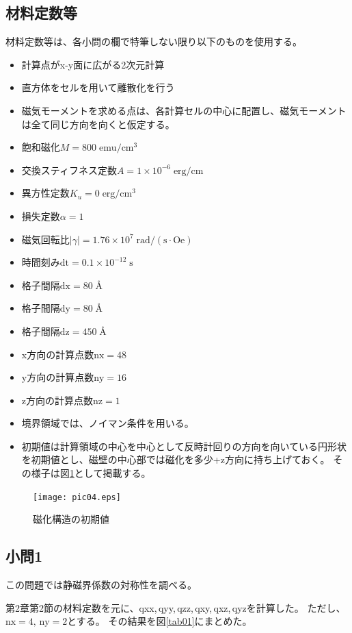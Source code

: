 \documentclass{jsarticle}
\begin{document}
\subsection{材料定数等}
材料定数等は、各小問の欄で特筆しない限り以下のものを使用する。
\begin{itemize}
	\item 計算点がx-y面に広がる2次元計算
	\item 直方体をセルを用いて離散化を行う
	\item 磁気モーメントを求める点は、各計算セルの中心に配置し、磁気モーメントは全て同じ方向を向くと仮定する。
	\item 飽和磁化$M = 800\;\mathrm{emu/cm^3}$
	\item 交換スティフネス定数$A = 1\times 10^{-6}\;\mathrm{erg/cm}$
	\item 異方性定数$K_u = 0\;\mathrm{erg/cm^3}$
	\item 損失定数$\alpha = 1$
	\item 磁気回転比$\lvert\gamma\rvert = 1.76\times 10^7\;\mathrm{rad/(s\cdot Oe)}$
	\item 時間刻み$\mathrm{dt} = 0.1\times 10^{-12}\;\mathrm{s}$
	\item 格子間隔$\mathrm{dx} = 80\;$\AA
	\item 格子間隔$\mathrm{dy} = 80\;$\AA
	\item 格子間隔$\mathrm{dz} = 450\;$\AA
	\item x方向の計算点数$\mathrm{nx} = 48$
	\item y方向の計算点数$\mathrm{ny} = 16$
	\item z方向の計算点数$\mathrm{nz} = 1$
	\item 境界領域では、ノイマン条件を用いる。
	\item 初期値は計算領域の中心を中心として反時計回りの方向を向いている円形状を初期値とし、磁壁の中心部では磁化を多少+z方向に持ち上げておく。
		その様子は図\ref{fig04}として掲載する。
\end{itemize}
\begin{figure}[H]
	\centering
	\texttt{[image: pic04.eps]}
	\caption{磁化構造の初期値}
	\label{fig04}
\end{figure}

\subsection{小問1}
この問題では静磁界係数の対称性を調べる。

第2章第2節の材料定数を元に、qxx,\,qyy,\,qzz,\,qxy,\,qxz,\,qyzを計算した。
ただし、$\mathrm{nx} = 4,\,\mathrm{ny} = 2$とする。
その結果を図\ref{tab01}にまとめた。
\end{document}
